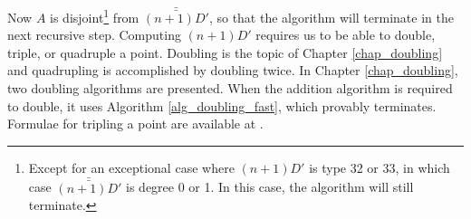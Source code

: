 Now $A$ is disjoint\footnote
{Except for an exceptional case where $(n + 1)D'$ is type 32 or 33,
in which case $\bar{\bar{(n + 1)D'}}$ is degree 0 or 1.
In this case, the algorithm will still terminate.}
from $\bar{\bar{(n + 1)D'}}$, so that the algorithm will terminate in the next recursive step.
Computing $(n + 1)D'$ requires us to be able to double, triple, or quadruple a point.
Doubling is the topic of Chapter \ref{chap_doubling} and quadrupling is accomplished by doubling twice.
In Chapter \ref{chap_doubling}, two doubling algorithms are presented.
When the addition algorithm is required to double, it uses Algorithm \ref{alg_doubling_fast},
which provably terminates.
Formulae for tripling a point are available at \cite{github}.

\begin{comment}
Having now shown that we can compute $D + D'$ in a way that will terminate,
we must now show how to find the relevant values $D''$, $P$, and $n$ where necessary.

Suppose $\deg D' = 2$, and we wish to find $P$ such that $D = P + D'$.
Since $\deg D > \deg D'$, we must have $\type D = 31$.
It may be that $\type D' = 21$ or $\type D' = 22$, so we consider each case separately.

Suppose first that $D'$ is of type 21. 
Let $P$ be represented by the type 11 divisor $\pid{s, t} = \pid{x + s_0, y + t_0}$.
Let $D$ and $D'$ be
\begin{align*}
  D &= \pid{f, g, h} & D' &= \pid{f', g'} \\
  f &= x^2 + f_2y + f_1x + f_0 & f' &= y + f'_1x + f'_0 \\
  g &= xy + g_2y + g_1x + g_0 & g' &= x^2 + g'_1x + g'_0 \\
  h &= y^2 + h_2y + h_1x + h_0.
\end{align*}

We need to solve for $s_0$ and $t_0$ such that
\[ \pid{f, g, h} = \pid{s, t}\pid{f', g', h'}. \]
A solution exists and must satisfy $sf' - f'_1f - g \in \pid{f,g,h}$.
We have that
  \[ sf' - f'_1f - g = (s_0 - f_2f'_1 - g_2)y + (f'_0 + f'_1s_0 - f_1f'_1 - g_1)x + (f'_0s_0 - f_0f'_1 - g_0). \]
It must be that each of these coefficients are zero, otherwise $f, g, h$ would not form a reduced Gr\"obner basis.
Therefore
  \[ s_0 = f_2f'_1 + g_2. \]
Likewise, we compute
  \[ tf' - f'_1g - h = (f'_0 + t_0 - f'_1g_2 - h_0)y + (f'_1t_0 - f'_1g_1 - h_1)x + (f'_0t_0 - f'_1g_0 - h_0) \]
and conclude
  \[ t_0 = - f'_0 + f'_1g_2 + h_0. \]

When $D'$ is of type 22, the same strategy yields $s_0$ and $t_0$.
We reduce $sf' = (x + s_0)(x + f'_0)$ and $tf' = (y + t_0)(x + f'_0)$ modulo $I_D$,
argue these reductions are zero, and conclude
\begin{align*}
  s_0 &= - f'_0 - f_1 \\
  t_0 &= g_1.
\end{align*}


\end{comment}
